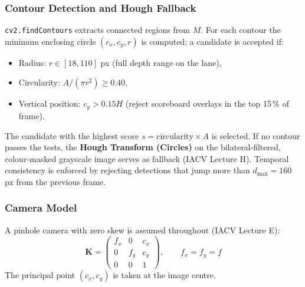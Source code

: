 \documentclass[11pt,twoside]{article}
\begin{document}
\subsubsection*{Contour Detection and Hough Fallback}
\texttt{cv2.findContours} extracts connected regions from $M$.
For each contour the minimum enclosing circle $(c_x, c_y, r)$ is computed; a candidate is accepted if:
\begin{itemize}
    \item Radius: $r \in [18, 110]$ px (full depth range on the lane),
    \item Circularity: $A / (\pi r^2) \geq 0.40$,
    \item Vertical position: $c_y > 0.15 H$ (reject scoreboard overlays in the top 15\,\% of frame).
\end{itemize}
The candidate with the highest score $s = \text{circularity} \times A$ is selected.
If no contour passes the tests, the \textbf{Hough Transform (Circles)} on the bilateral-filtered, colour-masked grayscale image serves as fallback (IACV Lecture H).
Temporal consistency is enforced by rejecting detections that jump more than $d_{\max} = 160$ px from the previous frame.

{}

\subsubsection*{Camera Model}
A pinhole camera with zero skew is assumed throughout (IACV Lecture E):
\begin{equation}
    \mathbf{K} = \begin{pmatrix} f_x & 0 & c_x \\ 0 & f_y & c_y \\ 0 & 0 & 1 \end{pmatrix}, \qquad f_x = f_y = f
\end{equation}
The principal point $(c_x, c_y)$ is taken at the image centre.
\end{document}
